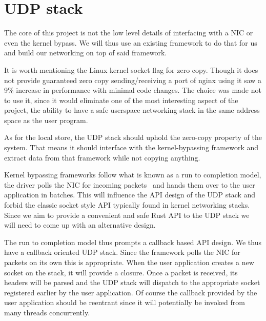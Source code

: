 \section{UDP stack} \label{sec:udp-design}

The core of this project is not the low level details of interfacing
with a NIC or even the kernel bypass. We will thus use an existing
framework to do that for us and build our networking on top of said
framework.

It is worth mentioning the Linux kernel socket flag for zero copy.
Though it does not provide guaranteed zero copy sending/receiving a
port of nginx using it saw a 9\% increase in performance with minimal
code changes. The choice was made not to use it, since it would
eliminate one of the most interesting aspect of the project, the
ability to have a safe userspace networking stack in the same address
space as the user program.

As for the local store, the UDP stack should uphold the zero-copy
property of the system. That means it should interface with the
kernel-bypassing framework and extract data from that framework while
not copying anything.

Kernel bypassing frameworks follow what is known as a run to
completion model, the driver polls the NIC for incoming
packets~\cite{dpdk-pmd} and hands them over to the user application in
batches. This will influence the API design of the UDP stack and
forbid the classic socket style API typically found in kernel
networking stacks. Since we aim to provide a convenient and safe Rust
API to the UDP stack we will need to come up with an alternative
design.

The run to completion model thus prompts a callback based API
design. We thus have a callback oriented UDP stack. Since the
framework polls the NIC for packets on its own this is
appropriate. When the user application creates a new socket on the
stack, it will provide a closure. Once a packet is received, its
headers will be parsed and the UDP stack will dispatch to the
appropriate socket registered earlier by the user application. Of
course the callback provided by the user application should be
reentrant since it will potentially be invoked from many threads
concurrently.


